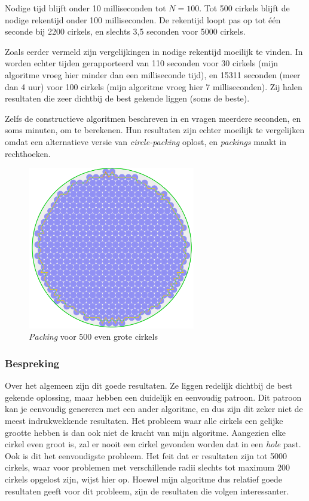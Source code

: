 \documentclass[12pt,a4paper,oneside]{book}
\begin{document}
{Nodige tijd blijft onder 10 milliseconden tot $N=100$.
Tot 500 cirkels blijft de nodige rekentijd onder 100 milliseconden.
De rekentijd loopt pas op tot één seconde bij 2200 cirkels, en slechts 3,5 seconden voor 5000 cirkels.

Zoals eerder vermeld zijn vergelijkingen in nodige rekentijd moeilijk te vinden.
In \cite{grosso2010} worden echter tijden gerapporteerd van 110 seconden voor 30 cirkels (mijn algoritme vroeg hier minder dan een milliseconde tijd), en 15311 seconden (meer dan 4 uur) voor 100 cirkels (mijn algoritme vroeg hier 7 milliseconden).
Zij halen resultaten die zeer dichtbij de best gekende liggen (soms de beste).

Zelfs de constructieve algoritmen beschreven in \cite{akeb2006basic} en \cite{hifi2004approximate} vragen meerdere seconden, en soms minuten, om te berekenen.
Hun resultaten zijn echter moeilijk te vergelijken omdat \cite{akeb2006basic} een alternatieve versie van \textit{circle-packing} oplost, en \cite{hifi2004approximate} \textit{packings} maakt in rechthoeken.

\begin{figure}
  \centering
  \includegraphics[width=0.65\textwidth]{packing-even-groot-500.png}
  \caption{\textit{Packing} voor 500 even grote cirkels} \label{fig:packing-even-groot-500} 
\end{figure}

\subsubsection{Bespreking}

Over het algemeen zijn dit goede resultaten.
Ze liggen redelijk dichtbij de best gekende oplossing, maar hebben een duidelijk en eenvoudig patroon.
Dit patroon kan je eenvoudig genereren met een ander algoritme, en dus zijn dit zeker niet de meest indrukwekkende resultaten.
Het probleem waar alle cirkels een gelijke grootte hebben is dan ook niet de kracht van mijn algoritme.
Aangezien elke cirkel even groot is, zal er nooit een cirkel gevonden worden dat in een \textit{hole} past.
Ook is dit het eenvoudigste probleem.
Het feit dat er resultaten zijn tot 5000 cirkels, waar voor problemen met verschillende radii slechts tot maximum 200 cirkels opgelost zijn, wijst hier op.
Hoewel mijn algoritme dus relatief goede resultaten geeft voor dit probleem, zijn de resultaten die volgen interessanter.

}
\end{document}
